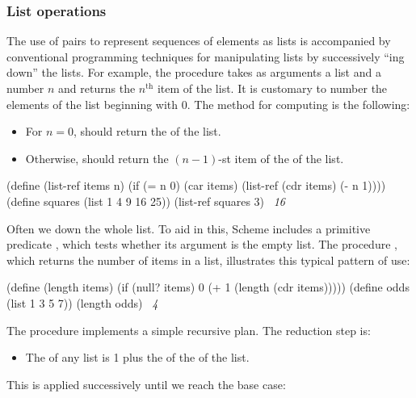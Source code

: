 \subsubsection*{List operations}

The use of pairs to represent sequences of elements as lists is accompanied by
conventional programming techniques for manipulating lists by successively
``ing down'' the lists.  For example, the procedure 
takes as arguments a list and a number \( n \) and returns the \( n^{\mathrm{th}} \) item of
the list.  It is customary to number the elements of the list beginning with 0.
The method for computing  is the following:

\begin{itemize}
\item
For \( n = 0 \),  should return the  of the list.

\item
Otherwise,  should return  the \( (n - 1) \)-st item of the
 of the list.
\end{itemize}

\begin{codeBlock}
(define (list-ref items n)
  (if (= n 0)
      (car items)
      (list-ref (cdr items) (- n 1))))
(define squares (list 1 4 9 16 25))
(list-ref squares 3)
~\textit{16}~
\end{codeBlock}

\noindent
Often we  down the whole list.  To aid in this, Scheme includes a
primitive predicate , which tests whether its argument is the empty
list.  The procedure , which returns the number of items in a
list, illustrates this typical pattern of use:

\begin{codeBlock}
(define (length items)
  (if (null? items)
      0
      (+ 1 (length (cdr items)))))
(define odds (list 1 3 5 7))
(length odds)
~\textit{4}~
\end{codeBlock}

\noindent
The  procedure implements a simple recursive plan. The reduction
step is:

\begin{itemize}
\item
The  of any list is 1 plus the  of the  of
the list.
\end{itemize}

\noindent
This is applied successively until we reach the base case:

